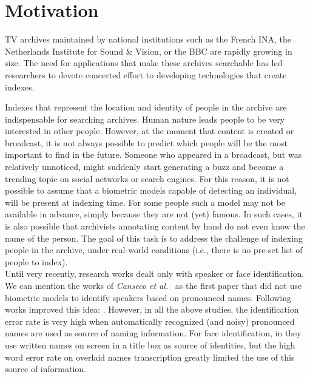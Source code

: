 \documentclass{acm_proc_article-me}
\begin{document}
\maketitle
\begin{abstract}

\end{abstract}

\section{Motivation}

TV archives maintained by national institutions such as the French INA, the Netherlands Institute for Sound \& Vision, or the BBC are rapidly growing in size. The need for applications that make these archives searchable has led researchers to devote concerted effort to developing technologies that create indexes.

Indexes that represent the location and identity of people in the archive are indispensable for searching archives. Human nature leads people to be very interested in other people. However, at the moment that content is created or broadcast, it is not always possible to predict which people will be the most important to find in the future. Someone who appeared in a broadcast, but was relatively unnoticed, might suddenly start generating a buzz and become a trending topic on social networks or search engines. For this reason, it is not possible to assume that a biometric models capable of detecting an individual, will be present at indexing time. For some people such a model may not be available in advance, simply because they are not (yet) famous. In such cases, it is also possible that archivists annotating content by hand do not even know the name of the person. The goal of this task is to address the challenge of indexing people in the archive, under real-world conditions (i.e., there is no pre-set list of people to index). \\

Until very recently, research works dealt only with speaker or face identification. We can mention the works of \textit{Canseco et al.}~\cite{CANSECO--ASRU--2005, CANSECO--INTERSPEECH--2004} as the first paper that did not use biometric models to identify speakers based on pronounced names. Following works improved this idea: \cite{ESTEVE--INTERSPEECH--2007, JOUSSE--ICCASP--2009, MAUCLAIR--Odyssey--2006, TRANTER--ICASSP--2006}. However, in all the above studies, the identification error rate is very high when automatically recognized (and noisy) pronounced names are used as source of naming information. For face identification, in \cite{HOUGHTON--IS--1999, SATOH--IEEEMM--1999, YANG--ACMMM--2004, YANG--ACMMM--2005} they use written names on screen in a title box as source of identities, but the high word error rate on overlaid names transcription greatly limited the use of this source of information.
\end{document}
